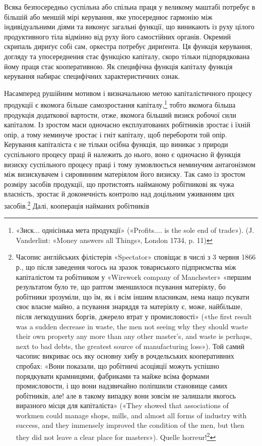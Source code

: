 Всяка безпосередньо суспільна або спільна праця у великому
маштабі потребує в більшій або меншій мірі керування, яке упосереднює
гармонію між індивідуальними діями та виконує загальні
функції, що виникають із руху цілого продуктивного тіла
відмінно від руху його самостійних органів. Окремий скрипаль
дириґує собі сам, оркестра потребує дириґента. Ця функція
керування, догляду та упосереднення стає функцією капіталу,
скоро тільки підпорядкована йому праця стає кооперативною.
Як специфічна функція капіталу функція керування набирає
специфічних характеристичних ознак.

Насамперед рушійним мотивом і визначальною метою капіталістичного
процесу продукції є якомога більше самозростання
капіталу,\footnote{
«Зиск... однісінька мета продукції» («Profits.... is the sole end
of trade»). (J. Vanderlint: «Money answers all Things», London 1734,
p. 11)
} тобто якомога більша продукція додаткової вартости,
отже, якомога більший визиск робочої сили капіталом. Із зростом
маси одночасно експлуатованих робітників зростає і їхній
опір, а тому неминуче зростає і гніт капіталу, щоб перебороти
той опір. Керування капіталіста є не тільки осібна функція, що
виникає з природи суспільного процесу праці й належить до нього,
воно є одночасно й функція визиску суспільного процесу праці
і тому зумовлюється неминучим антагонізмом між визискувачем
і сировинним матеріялом його визиску. Так само із зростом розміру
засобів продукції, що протистоять найманому робітникові
як чужа власність, зростає й доконечність контролю над доцільним
уживанням цих засобів.\footnote{
Часопис англійських філістерів «Spectator» сповіщає в числі
з 3 червня 1866 р., що після заведення чогось на зразок товариського підприємства
між капіталістом та робітником у «Wirework company of Manchester»
«першим результатом було те, що раптом зменшилося псування
матеріялу, бо робітники зрозуміли, що їм, як і всім іншим власникам,
нема нащо псувати своє власне майно, а псування знаряддя та матеріялу
є, може, найбільше, після легкодушних боргів, джерело втрат у промисловості»
(«the first result was a sudden decrease in waste, the men not seeing
why they should waste their own property any more than any other master’s,
and waste is perhaps, next to bad debts, the greatest source of manufacturing
loss»). Той самий часопис викриває ось яку основну хибу в рочдельських кооперативних
спробах: «Вони показали, що робітничі асоціяції можуть
успішно порядкувати крамницями, фабриками та майже всіма формами
промисловости, і що вони надзвичайно поліпшили становище самих робітників,
але! але в такому випадку вони зовсім не залишали якогось виразного
місця для капіталіста» («They showed that associations of workmen
could manage shops, mills, and almost all forms of industry with success,
and they immensely improved the condition of the men, but then they did
not leave a clear place for masters»). Quelle horreur!\footnote*{
Який жах! Ред.
}
} Далі, кооперація найманих робітників
